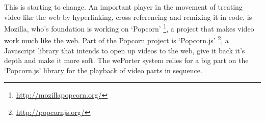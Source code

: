 This is starting to change. An important player in the movement of treating video like the web by hyperlinking, cross referencing and remixing it in code, is Mozilla, who's foundation is working on `Popcorn' \footnote{\url{http://mozillapopcorn.org/}}, a project that makes video work much like the web. Part of the Popcorn project is `Popcorn.js' \footnote{\url{http://popcornjs.org/}}, a Javascript library that intends to open up videos to the web, give it back it's depth and make it more soft. The wePorter system relies for a big part on the `Popcorn.js' library for the playback of video parts in sequence.

